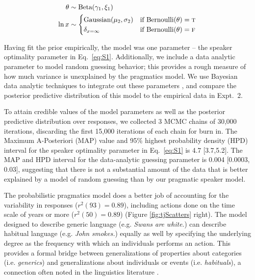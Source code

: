 \documentclass[10pt,letterpaper]{article}
\begin{document}
\begin{minipage}{0.5 \textwidth} \small
\begin{align*}
\theta & \sim \text{Beta}(\gamma_{1}, \xi_{1}) \\ 
\ln x & \sim \begin{cases} 
		\text{Gaussian}(\mu_{2}, \sigma_{2}) &\mbox{if } \text{Bernoulli}(\theta) = \textsc{t} \\
				\delta_{x=\infty} &\mbox{if } \text{Bernoulli}(\theta) = \textsc{f} \\
		\end{cases} \\
\end{align*}
\end{minipage}

Having fit the prior empirically, the model was one parameter -- the speaker optimality parameter in Eq.~\ref{eq:S1}. 
Additionally, we include a data analytic parameter to model random guessing behavior; this provides a rough measure of how much variance is unexplained by the pragmatics model. 
We use Bayesian data analytic techniques to integrate out these parameters \cite{LW2014}, and compare the posterior predictive distribution of this model to the empirical data in Expt.~2.

To attain credible values of the model parameters as well as the posterior predictive distribution over responses, we collected 3 MCMC chains of 30,000 iterations, discarding the first 15,000 iterations of each chain for burn in.
The Maximum A-Posteriori (MAP) value and 95\% highest probability density (HPD) interval for the speaker optimality parameter in Eq.~\ref{eq:S1} is 4.7 [3.7,5.2].
The MAP and HPD interval for the data-analytic guessing parameter is 0.004 [0.0003, 0.03], suggesting that there is not a substantial amount of the data that is better explained by a model of random guessing than by our pragmatic speaker model.

The probabilistic pragmatics model does a better job of accounting for the variability in responses ($r^2(93) = 0.89$), including actions done on the time scale of years or more  ($r^2(50) = 0.89$) (Figure \ref{fig:tjScatters} right).
The model designed to describe generic language (e.g. \emph{Swans are white.}) can describe habitual language (e.g. \emph{John smokes.}) equally as well by specifying the underlying degree as the frequency with which an individuals performs an action.
This provides a formal bridge between generalizations of properties about categories (i.e. \emph{generics}) and generalizations about individuals or events (i.e. \emph{habituals}), a connection often noted in the linguistics literature \cite{Carlson1977, Carlson2005, Cohen1999}. 
\end{document}
